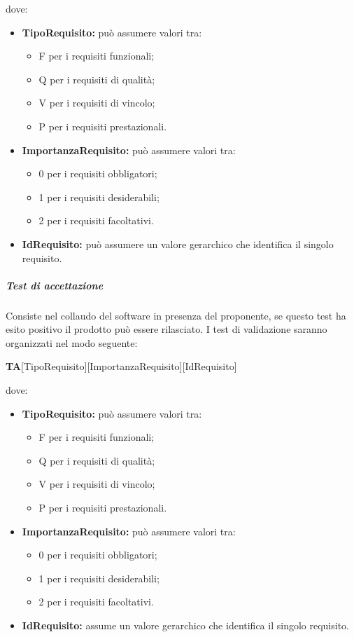 dove:
\begin{itemize}
	\item \textbf{TipoRequisito:} può assumere valori tra:
	\begin{itemize}
		\item F per i requisiti funzionali;
		\item Q per i requisiti di qualità;
		\item V per i requisiti di vincolo;
		\item P per i requisiti prestazionali.
	\end{itemize}
	
	\item \textbf{ImportanzaRequisito:} può assumere valori tra:
	\begin{itemize}
		\item 0 per i requisiti obbligatori;
		\item 1 per i requisiti desiderabili;
		\item 2 per i requisiti facoltativi.
	\end{itemize}
	
	\item \textbf{IdRequisito:} può assumere un valore gerarchico che identifica il singolo requisito.
\end{itemize}
\subparagraph{Test di accettazione} \Spazio
Consiste nel collaudo del software in presenza del proponente, se questo test ha esito positivo il prodotto può essere rilasciato.\newline
	I test di validazione saranno organizzati nel modo seguente:\Spazio

\centerline{\textbf{TA}[TipoRequisito][ImportanzaRequisito][IdRequisito]}

dove:
\begin{itemize}
	\item \textbf{TipoRequisito:} può assumere valori tra:
	\begin{itemize}
		\item F per i requisiti funzionali;
		\item Q per i requisiti di qualità;
		\item V per i requisiti di vincolo;
		\item P per i requisiti prestazionali.
	\end{itemize}
	\item \textbf{ImportanzaRequisito:} può assumere valori tra:
	\begin{itemize}
		\item 0 per i requisiti obbligatori;
		\item 1 per i requisiti desiderabili;		
		\item 2 per i requisiti facoltativi.
	\end{itemize}
	
	\item \textbf{IdRequisito:} assume un valore gerarchico che identifica il singolo requisito.
	
\end{itemize}
